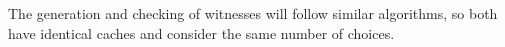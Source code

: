\documentclass{llncs}
\newcommand{\figfoot}{\vspace{1ex}\hrule}
\newcommand{\vd}{\vdash}
\begin{document}


The generation and checking of witnesses will follow similar
algorithms, so both have identical caches and consider the same number
of choices. 
\end{document}
